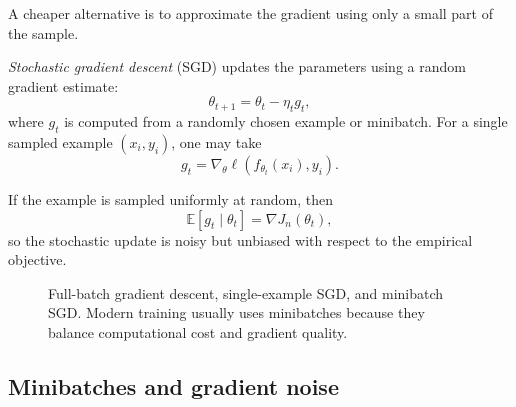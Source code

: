 A cheaper alternative is to approximate the gradient using only a small part of the sample.

\begin{definition}
\emph{Stochastic gradient descent} (SGD) updates the parameters using a random gradient estimate:
\[
\theta_{t+1}=\theta_t-\eta_t g_t,
\]
where $g_t$ is computed from a randomly chosen example or minibatch. For a single sampled example $(x_i,y_i)$, one may take
\[
g_t=\nabla_\theta \ell(f_{\theta_t}(x_i),y_i).
\]
\end{definition}

If the example is sampled uniformly at random, then
\[
\mathbb E[g_t\mid \theta_t]=\nabla J_n(\theta_t),
\]
so the stochastic update is noisy but unbiased with respect to the empirical objective.

\begin{figure}[tbp]
\centering
{}
\caption{Full-batch gradient descent, single-example SGD, and minibatch SGD. Modern training usually uses minibatches because they balance computational cost and gradient quality.}
\end{figure}

\subsection*{Minibatches and gradient noise}

